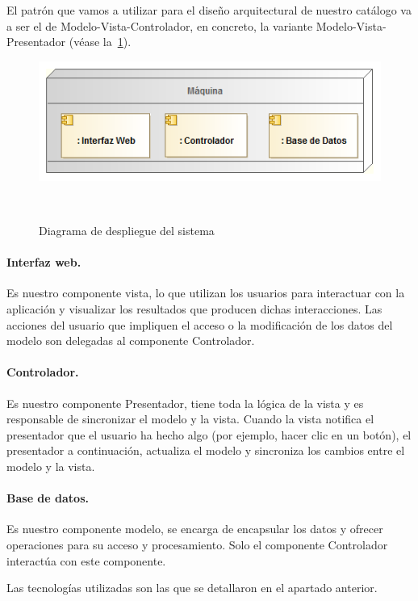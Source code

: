 El patrón que vamos a utilizar para el diseño arquitectural de nuestro 
catálogo va a ser el de Modelo-Vista-Controlador, en concreto, la variante Modelo-Vista-Presentador 
(véase la~\cref{fig:diagDespliegue}).

\vspace{.2cm}
\begin{figure}[ht]
\centerline{\includegraphics[scale=0.6]{img/diagrama_despliegue}}\
\caption{Diagrama de despliegue del sistema}
\label{fig:diagDespliegue}
\end{figure}


\paragraph{Interfaz web.} Es nuestro componente vista, lo que utilizan los usuarios para 
interactuar con la aplicación y visualizar los resultados que producen dichas
interacciones. Las acciones del usuario que impliquen el acceso o la modificación
de los datos del modelo son delegadas al componente Controlador.

\paragraph{Controlador.} Es nuestro componente Presentador, tiene toda la lógica de la vista 
y es responsable de sincronizar el modelo y la vista. Cuando la vista notifica el 
presentador que el usuario ha hecho algo (por ejemplo, hacer clic en un botón), 
el presentador a continuación, actualiza el modelo y sincroniza los cambios 
entre el modelo y la vista.

\paragraph{Base de datos.} Es nuestro componente modelo, se encarga de encapsular 
los datos y ofrecer operaciones para su acceso y procesamiento. Solo el componente
Controlador interactúa con este componente.

Las tecnologías utilizadas son las que se detallaron en el apartado anterior.